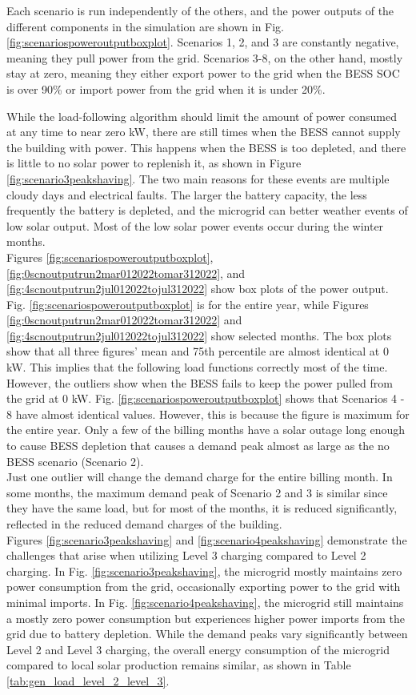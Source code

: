 \documentclass[conference,  usletter]{IEEEtran}
\begin{document}
Each scenario is run independently of the others, and the power outputs of the different components in the simulation are shown in Fig. \ref{fig:scenariospoweroutputboxplot}. Scenarios 1, 2, and 3 are constantly negative, meaning they pull power from the grid. Scenarios 3-8, on the other hand, mostly stay at zero, meaning they either export power to the grid when the BESS SOC is over 90\% or import power from the grid when it is under 20\%.

While the load-following algorithm should limit the amount of power consumed at any time to near zero kW, there are still times when the BESS cannot supply the building with power. This happens when the BESS is too depleted, and there is little to no solar power to replenish it, as shown in Figure \ref{fig:scenario3peakshaving}. The two main reasons for these events are multiple cloudy days and electrical faults. The larger the battery capacity, the less frequently the battery is depleted, and the microgrid can better weather events of low solar output. Most of the low solar power events occur during the winter months.\\
\indent Figures \ref{fig:scenariospoweroutputboxplot}, \ref{fig:0scnoutputrun2mar012022tomar312022}, and \ref{fig:4scnoutputrun2jul012022tojul312022} show box plots of the power output. Fig. \ref{fig:scenariospoweroutputboxplot} is for the entire year, while Figures \ref{fig:0scnoutputrun2mar012022tomar312022} and \ref{fig:4scnoutputrun2jul012022tojul312022} show selected months. The box plots show that all three figures' mean and 75th percentile are almost identical at 0 kW. This implies that the following load functions correctly most of the time. However, the outliers show when the BESS fails to keep the power pulled from the grid at 0 kW. Fig. \ref{fig:scenariospoweroutputboxplot} shows that Scenarios 4 - 8 have almost identical values. However, this is because the figure is maximum for the entire year. Only a few of the billing months have a solar outage long enough to cause BESS depletion that causes a demand peak almost as large as the no BESS scenario (Scenario 2).\\
\indent Just one outlier will change the demand charge for the entire billing month. In some months, the maximum demand peak of Scenario 2 and 3 is similar since they have the same load, but for most of the months, it is reduced significantly, reflected in the reduced demand charges of the building. \\ 
\indent Figures \ref{fig:scenario3peakshaving} and \ref{fig:scenario4peakshaving} demonstrate the challenges that arise when utilizing Level 3 charging compared to Level 2 charging. In Fig. \ref{fig:scenario3peakshaving}, the microgrid mostly maintains zero power consumption from the grid, occasionally exporting power to the grid with minimal imports. In Fig. \ref{fig:scenario4peakshaving}, the microgrid still maintains a mostly zero power consumption but experiences higher power imports from the grid due to battery depletion. While the demand peaks vary significantly between Level 2 and Level 3 charging, the overall energy consumption of the microgrid compared to local solar production remains similar, as shown in Table \ref{tab:gen_load_level_2_level_3}.\\
\end{document}
